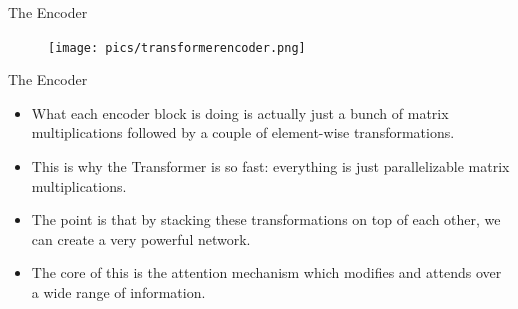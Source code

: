 \documentclass[handout]{beamer}
\begin{document}
\begin{frame}{The Encoder}

     \begin{figure}[h]
        	\texttt{[image: pics/transformerencoder.png]}
        \end{figure}  


\end{frame}

\begin{frame}{The Encoder}
\begin{scriptsize}
\begin{itemize}

 \item  What each encoder block is doing is actually just a bunch of matrix multiplications followed by a couple of element-wise transformations.
 
 \item This is why the Transformer is so fast: everything is just parallelizable matrix multiplications.
 
 \item The point is that by stacking these transformations on top of each other, we can create a very powerful network. 
 
 \item The core of this is the attention mechanism which modifies and attends over a wide range of information.
 
\end{itemize}

\end{scriptsize}

\end{frame}
\end{document}
